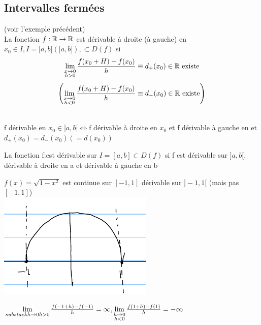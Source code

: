 \documentclass[12pt,a4paper]{article}
\begin{document}
{\subsection{Intervalles fermées}
\begin{boite}
\Definition (voir l'exemple précédent)\\
La fonction $f: \mathbb{R} \to \mathbb{R}$ est dérivable à droite (à gauche) en $x_0 \in I, I = [a,b[ (]a,b]), \subset D(f)$ si 
\begin{equation}
\lim\limits_{\substack{x \to 0 \\ h > 0}} \frac{f(x_0 + H) - f(x_0)}{h} \equiv d_+(x_0) \in \mathbb{R}\mbox{ existe}
\end{equation}
\begin{equation}
\left(\lim\limits_{\substack{x \to 0 \\ h < 0}} \frac{f(x_0 + H) - f(x_0)}{h} \equiv d_-(x_0)  \in \mathbb{R}\mbox{ existe}\right)
\end{equation}
\end{boite}
\begin{boite}
\\
f dérivable en $x_0 \in ]a,b[ \iff $f dérivable à droite en $x_0$ et f dérivable à gauche en \Xo et $d_+(x_0) = d_-(x_0) (=d(x_0))$
\end{boite}
\begin{boite}
\Definition
La fonction f:\rtor est dérivable sur $I=[a,b] \subset D(f)$ si f est dérivable sur $]a,b[$, dérivable à droite en a et dérivable à gauche en b
\end{boite}
\begin{boite}
 $f(x) = \sqrt{1-x^2}$ est continue sur $[-1,1]$ dérivable sur $]-1,1[$ (mais pas $[-1,1]$)\\
\includegraphics[scale=0.5]{illustrations_Analyse/sqrtx}
\end{boite}
$\lim\limits_{substack{h \to 0 \\ h > 0}} \frac{f(-1+h) - f(-1)}{h} = \infty, \lim\limits_{\substack{h \to 0 \\ h < 0}} \frac{f(1+h) - f(1)}{h} = -\infty$
}
\end{document}
